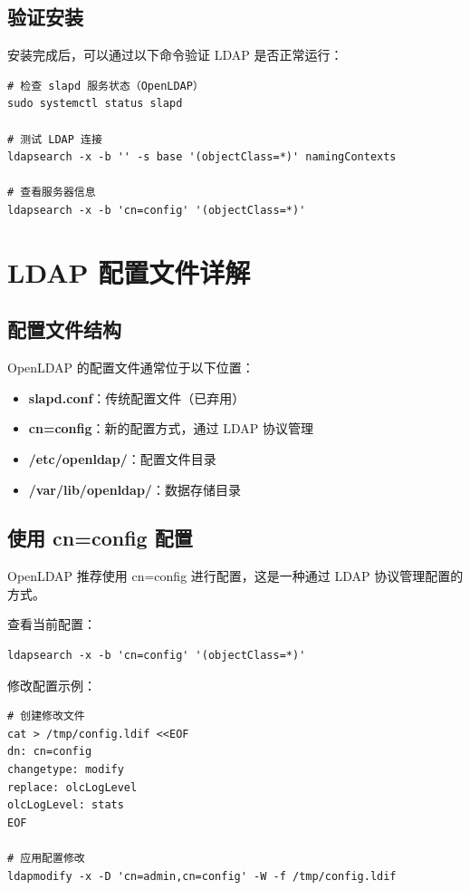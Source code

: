 \documentclass[12pt,UTF8]{ctexbook}
\begin{document}
\section{验证安装}
\label{sec:verify_install}

安装完成后，可以通过以下命令验证 LDAP 是否正常运行：

\begin{verbatim}
# 检查 slapd 服务状态（OpenLDAP）
sudo systemctl status slapd

# 测试 LDAP 连接
ldapsearch -x -b '' -s base '(objectClass=*)' namingContexts

# 查看服务器信息
ldapsearch -x -b 'cn=config' '(objectClass=*)'
\end{verbatim}

\chapter{LDAP 配置文件详解}
\label{chap:ldap_config}

\section{配置文件结构}
\label{sec:config_structure}

OpenLDAP 的配置文件通常位于以下位置：

\begin{itemize}
    \item \textbf{slapd.conf}：传统配置文件（已弃用）
    \item \textbf{cn=config}：新的配置方式，通过 LDAP 协议管理
    \item \textbf{/etc/openldap/}：配置文件目录
    \item \textbf{/var/lib/openldap/}：数据存储目录
\end{itemize}

\section{使用 cn=config 配置}
\label{sec:cn_config}

OpenLDAP 推荐使用 cn=config 进行配置，这是一种通过 LDAP 协议管理配置的方式。

查看当前配置：
\begin{verbatim}
ldapsearch -x -b 'cn=config' '(objectClass=*)'
\end{verbatim}

修改配置示例：
\begin{verbatim}
# 创建修改文件
cat > /tmp/config.ldif <<EOF
dn: cn=config
changetype: modify
replace: olcLogLevel
olcLogLevel: stats
EOF

# 应用配置修改
ldapmodify -x -D 'cn=admin,cn=config' -W -f /tmp/config.ldif
\end{verbatim}
\end{document}
